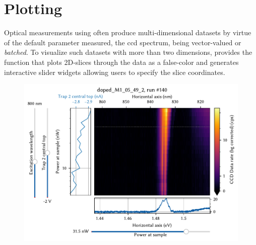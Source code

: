 \section{Plotting}\label{sec:exp:mjolnir:plotting}
Optical measurements using \mjolnir often produce multi-dimensional datasets by virtue of the default parameter measured, the \gls{ccd} spectrum, being vector-valued or \emph{batched}.
To visualize such datasets with more than two dimensions, \mjolnir provides the  function that plots 2D-slices through the data as a false-color and generates interactive slider widgets allowing users to specify the slice coordinates.
\begin{figure}
    \centering
    \includegraphics{img/pdf/experiment/plot_nd}
    \caption[]{
    }
    \label{fig:}
\end{figure}

